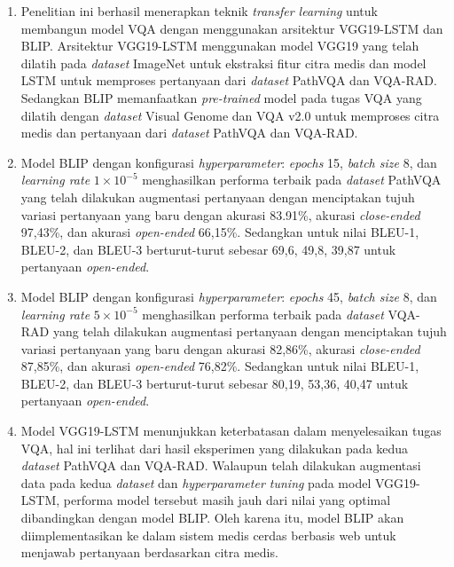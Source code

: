 \begin{enumerate}

    \item Penelitian ini berhasil menerapkan teknik \textit{transfer learning} untuk membangun model VQA dengan menggunakan arsitektur VGG19-LSTM dan BLIP. Arsitektur VGG19-LSTM menggunakan model VGG19 yang telah dilatih pada \textit{dataset} ImageNet untuk ekstraksi fitur citra medis dan model LSTM untuk memproses pertanyaan dari \textit{dataset} PathVQA dan VQA-RAD. Sedangkan BLIP memanfaatkan \textit{pre-trained} model pada tugas VQA yang dilatih dengan \textit{dataset} Visual Genome dan VQA v2.0 untuk memproses citra medis dan pertanyaan dari \textit{dataset} PathVQA dan VQA-RAD.


    \item Model BLIP dengan konfigurasi \textit{hyperparameter}: \textit{epochs} 15, \textit{batch size} 8, dan \textit{learning rate} $1 \times 10^{-5}$ menghasilkan performa terbaik pada \textit{dataset} PathVQA yang telah dilakukan augmentasi pertanyaan dengan menciptakan tujuh variasi pertanyaan yang baru dengan akurasi 83.91\%, akurasi \textit{close-ended} 97,43\%, dan akurasi \textit{open-ended} 66,15\%. Sedangkan untuk nilai BLEU-1, BLEU-2, dan BLEU-3 berturut-turut sebesar 69,6, 49,8, 39,87 untuk pertanyaan \textit{open-ended}.

    \item Model BLIP dengan konfigurasi \textit{hyperparameter}: \textit{epochs} 45, \textit{batch size} 8, dan \textit{learning rate} $5 \times 10^{-5}$ menghasilkan performa terbaik pada \textit{dataset} VQA-RAD yang telah dilakukan augmentasi pertanyaan dengan menciptakan tujuh variasi pertanyaan yang baru dengan akurasi 82,86\%, akurasi \textit{close-ended} 87,85\%, dan akurasi \textit{open-ended} 76,82\%. Sedangkan untuk nilai BLEU-1, BLEU-2, dan BLEU-3 berturut-turut sebesar 80,19, 53,36, 40,47 untuk pertanyaan \textit{open-ended}.

    \item Model VGG19-LSTM menunjukkan keterbatasan dalam menyelesaikan tugas VQA, hal ini terlihat dari hasil eksperimen yang dilakukan pada kedua \textit{dataset} PathVQA dan VQA-RAD. Walaupun telah dilakukan augmentasi data pada kedua \textit{dataset} dan \textit{hyperparameter tuning} pada model VGG19-LSTM, performa model tersebut masih jauh dari nilai yang optimal dibandingkan dengan model BLIP. Oleh karena itu, model BLIP akan diimplementasikan ke dalam sistem medis cerdas berbasis web untuk menjawab pertanyaan berdasarkan citra medis.


\end{enumerate}
